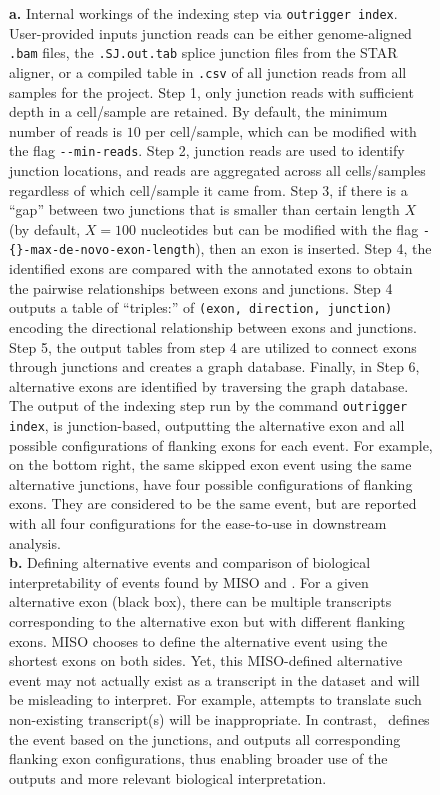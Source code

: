 \begin{figure}
{\textbf{a.} Internal workings of the indexing step via \texttt{outrigger index}. User-provided inputs junction reads can be either genome-aligned \texttt{.bam} files, the \texttt{.SJ.out.tab} splice junction files from the STAR aligner, or a compiled table in \texttt{.csv} of all junction reads from all samples for the project. Step 1, only junction reads with sufficient depth in a cell/sample are retained. By default, the minimum number of reads is $10$ per cell/sample, which can be modified with the flag \texttt{-{}-min-reads}. Step 2, junction reads are used to identify junction locations, and reads are aggregated across all cells/samples regardless of which cell/sample it came from. Step 3, if there is a ``gap'' between two junctions that is smaller than certain length $X$ (by default, $X=100$ nucleotides but can be modified with the flag \verb+-{}-max-de-novo-exon-length+), then an exon is inserted. Step 4, the identified exons are compared with the annotated exons to obtain the pairwise relationships between exons and junctions. Step 4 outputs a table of ``triples:'' of \texttt{(exon, direction, junction)} encoding the directional relationship between exons and junctions. Step 5, the output tables from step 4 are utilized to connect exons through junctions and creates a graph database. Finally, in Step 6, alternative exons are identified by traversing the graph database. The output of the indexing step run by the command \texttt{outrigger index}, is junction-based, outputting the alternative exon and all possible configurations of flanking exons for each event. For example, on the bottom right, the same skipped exon event using the same alternative junctions, have four possible configurations of flanking exons. They are considered to be the same event, but are reported with all four configurations for the ease-to-use in downstream analysis.\\
\textbf{b.} Defining alternative events and comparison of biological interpretability of events found by MISO and \outrigger. For a given alternative exon (black box), there can be multiple transcripts corresponding to the alternative exon but with different flanking exons. MISO chooses to define the alternative event using the shortest exons on both sides. Yet, this MISO-defined alternative event may not actually exist as a transcript in the dataset and will be misleading to interpret. For example, attempts to translate such non-existing transcript(s) will be inappropriate. In contrast, \outrigger\, defines the event based on the junctions, and outputs all corresponding flanking exon configurations, thus enabling broader use of the outputs and more relevant biological interpretation. 
}
\label{fig:outrigger_index}
\end{figure}



